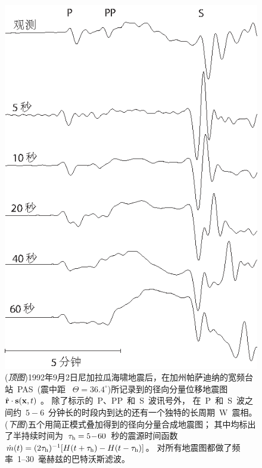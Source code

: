\begin{figure}[!t]
\begin{center}
\includegraphics{../figures/chap10/fig18.eps}
\end{center}
\caption[w-phase]{
\label{fig:10.W-phase}
({\em 顶图\/})1992年9月2日尼加拉瓜海啸地震后，在加州帕萨迪纳的宽频台站~PAS~(震中距 ~$\Theta=36.4^{\circ}$)所记录到的径向分量位移地震图~$\hat{\bf r}\cdot{\bf s}({\bf x},t)$ 。
除了标示的~P、PP~和~S~波讯号外，
在~P~和~S~波之间约~$5\!-\!6$~分钟长的时段内到达的还有一个独特的长周期~W~震相。
({\em 下图\/})五个用简正模式叠加得到的径向分量合成地震图；
其中均标出了半持续时间为~$\tau_{\rm h}=5\!-\!60$~秒的震源时间函数~$\dot{m}(t)=(2\tau_{\rm h})^{-1}[H(t+\tau_{\rm h})
-H(t-\tau_{\rm h})]$。
对所有地震图都做了频率~1--30~毫赫兹的巴特沃斯滤波。}
\end{figure}

